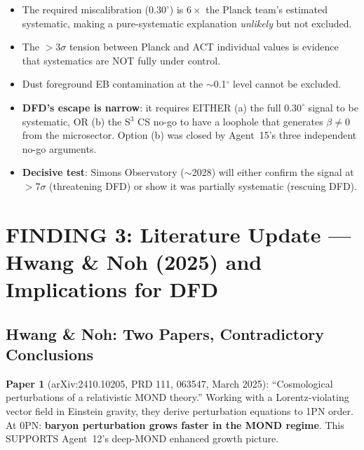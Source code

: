 \documentclass[11pt]{article}
\begin{document}
\begin{tcolorbox}[colback=yellow!5!white, colframe=yellow!70!black,
  title=\textbf{VERDICT: DFD's $\beta = 0$ Has a Narrow But Open Escape}]
\begin{itemize}
\item The required miscalibration ($0.30^\circ$) is $6\times$ the Planck
  team's estimated systematic, making a pure-systematic explanation
  \emph{unlikely} but not excluded.
\item The $>$3$\sigma$ tension between Planck and ACT individual values
  is evidence that systematics are NOT fully under control.
\item Dust foreground EB contamination at the $\sim$0.1$^\circ$ level
  cannot be excluded.
\item \textbf{DFD's escape is narrow}: it requires EITHER (a) the full
  $0.30^\circ$ signal to be systematic, OR (b) the S$^3$ CS no-go to
  have a loophole that generates $\beta \neq 0$ from the microsector.
  Option (b) was closed by Agent~15's three independent no-go arguments.
\item \textbf{Decisive test}: Simons Observatory ($\sim$2028) will either
  confirm the signal at $>$7$\sigma$ (threatening DFD) or show it was
  partially systematic (rescuing DFD).
\end{itemize}
\end{tcolorbox}


\section{FINDING 3: Literature Update --- Hwang \& Noh (2025) and
Implications for DFD}
\label{sec:literature}

\subsection{Hwang \& Noh: Two Papers, Contradictory Conclusions}

\textbf{Paper 1} (arXiv:2410.10205, PRD 111, 063547, March 2025): ``Cosmological
perturbations of a relativistic MOND theory.'' Working with a Lorentz-violating
vector field in Einstein gravity, they derive perturbation equations to 1PN order.
At 0PN: \textbf{baryon perturbation grows faster in the MOND regime}. This
SUPPORTS Agent~12's deep-MOND enhanced growth picture.
\end{document}

